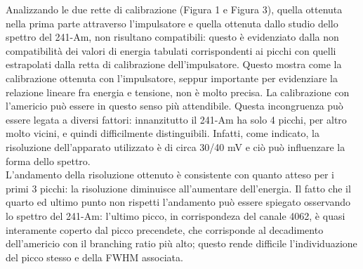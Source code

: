 \documentclass[a4paper,10pt]{article}
\begin{document}
\noindent Analizzando le due rette di calibrazione (Figura 1 e Figura 3), quella ottenuta nella prima parte attraverso l'impulsatore e quella ottenuta dallo studio dello spettro del 241-Am, non risultano compatibili: questo \`e evidenziato dalla non compatibilit\`a dei valori di energia tabulati corrispondenti ai picchi con quelli estrapolati dalla retta di calibrazione dell'impulsatore. Questo mostra come la calibrazione ottenuta con l'impulsatore, seppur importante per evidenziare la relazione lineare fra energia e tensione, non \`e molto precisa. La calibrazione con l'americio pu\`o essere in questo senso pi\`u attendibile. Questa incongruenza pu\`o essere legata a diversi fattori: innanzitutto il 241-Am ha solo 4 picchi, per altro molto vicini, e quindi difficilmente distinguibili. Infatti, come indicato, la risoluzione dell'apparato utilizzato \`e di circa 30/40 mV e ci\`o pu\`o influenzare la forma dello spettro.\\
L'andamento della risoluzione ottenuto \`e consistente con quanto atteso per i primi 3 picchi: la risoluzione diminuisce all'aumentare dell'energia. Il fatto che il quarto ed ultimo punto non rispetti l'andamento pu\`o essere spiegato osservando lo spettro del 241-Am: l'ultimo picco, in corrispondeza del canale 4062, \`e quasi interamente coperto dal picco precendete, che corrisponde al decadimento dell'americio con il branching ratio pi\`u alto; questo rende difficile l'individuazione del picco stesso e della FWHM associata. 
\end{document}
